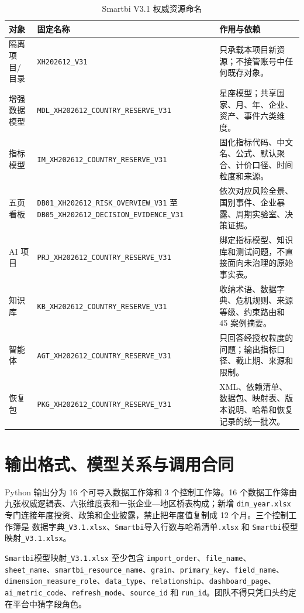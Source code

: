 \documentclass[UTF8,fontset=windows,12pt,openany]{ctexbook}
\newcommand{\Field}[1]{{\small\nolinkurl{#1}}}
\newcommand{\File}[1]{{\small\nolinkurl{#1}}}
\begin{document}
\begin{longtable}{p{3.4cm}p{5.4cm}p{5.2cm}}
\caption{Smartbi V3.1 权威资源命名}\label{tab:smartbi-resource-names}\\
\toprule
\textbf{对象} & \textbf{固定名称} & \textbf{作用与依赖}\\
\midrule
隔离项目/目录 & \Field{XH202612_V31} & 只承载本项目新资源；不接管账号中任何既存对象。\\
增强数据模型 & \Field{MDL_XH202612_COUNTRY_RESERVE_V31} & 星座模型；共享国家、月、年、企业、资产、事件六类维度。\\
指标模型 & \Field{IM_XH202612_COUNTRY_RESERVE_V31} & 固化指标代码、中文名、公式、默认聚合、计价口径、时间粒度和来源。\\
五页看板 & \Field{DB01_XH202612_RISK_OVERVIEW_V31} 至 \Field{DB05_XH202612_DECISION_EVIDENCE_V31} & 依次对应风险全景、国别事件、企业暴露、周期实验室、决策证据。\\
AI 项目 & \Field{PRJ_XH202612_COUNTRY_RESERVE_V31} & 绑定指标模型、知识库和测试问题，不直接面向未治理的原始事实表。\\
知识库 & \Field{KB_XH202612_COUNTRY_RESERVE_V31} & 收纳术语、数据字典、危机规则、来源等级、约束路由和 45 案例摘要。\\
智能体 & \Field{AGT_XH202612_COUNTRY_RESERVE_V31} & 只回答经授权粒度的问题；输出指标口径、截止期、来源和限制。\\
恢复包 & \Field{PKG_XH202612_COUNTRY_RESERVE_V31} & XML、依赖清单、数据包、映射表、版本说明、哈希和恢复记录的统一批次。\\
\bottomrule
\end{longtable}

\section{输出格式、模型关系与调用合同}

Python 输出分为 16 个可导入数据工作簿和 3 个控制工作簿。16 个数据工作簿由九张权威逻辑表、六张维度表和一张企业—地区桥表构成；新增 \Field{dim_year.xlsx} 专门连接年度投资、政策和企业披露，禁止把年度值复制成 12 个月。三个控制工作簿是 \textsf{数据字典}\File{_V3.1.xlsx}、\File{Smartbi}\textsf{导入行数与哈希清单}\File{.xlsx} 和 \File{Smartbi}\textsf{模型映射}\File{_V3.1.xlsx}。

\File{Smartbi}\textsf{模型映射}\File{_V3.1.xlsx} 至少包含 \Field{import_order}、\Field{file_name}、\Field{sheet_name}、\Field{smartbi_resource_name}、\Field{grain}、\Field{primary_key}、\Field{field_name}、\Field{dimension_measure_role}、\Field{data_type}、\Field{relationship}、\Field{dashboard_page}、\Field{ai_metric_code}、\Field{refresh_mode}、\Field{source_id} 和 \Field{run_id}。团队不得只凭口头约定在平台中猜字段角色。
\end{document}
